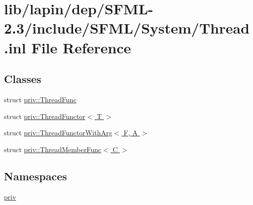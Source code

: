 \hypertarget{lapin_2dep_2_s_f_m_l-2_83_2include_2_s_f_m_l_2_system_2_thread_8inl}{\section{lib/lapin/dep/\-S\-F\-M\-L-\/2.3/include/\-S\-F\-M\-L/\-System/\-Thread.inl File Reference}
\label{lapin_2dep_2_s_f_m_l-2_83_2include_2_s_f_m_l_2_system_2_thread_8inl}
}
\subsection*{Classes}
\begin{DoxyCompactItemize}
\item 
struct \hyperlink{structpriv_1_1_thread_func}{priv\-::\-Thread\-Func}
\item 
struct \hyperlink{structpriv_1_1_thread_functor}{priv\-::\-Thread\-Functor$<$ T $>$}
\item 
struct \hyperlink{structpriv_1_1_thread_functor_with_arg}{priv\-::\-Thread\-Functor\-With\-Arg$<$ F, A $>$}
\item 
struct \hyperlink{structpriv_1_1_thread_member_func}{priv\-::\-Thread\-Member\-Func$<$ C $>$}
\end{DoxyCompactItemize}
\subsection*{Namespaces}
\begin{DoxyCompactItemize}
\item 
\hyperlink{namespacepriv}{priv}
\end{DoxyCompactItemize}
